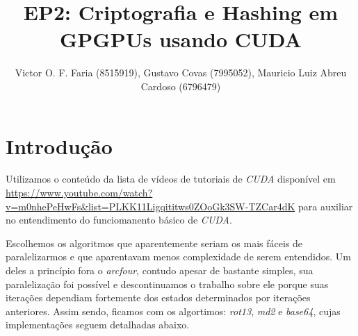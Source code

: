 \documentclass[final,12pt,a4paper]{elsarticle}
\begin{document}
\begin{frontmatter}


\title{EP2: Criptografia e Hashing em GPGPUs usando CUDA}




\author{Victor O. F. Faria (8515919), Gustavo Covas (7995052), Mauricio Luiz Abreu Cardoso (6796479)}

\address{MAC 5742-0219 Introdução à Programação Concorrente, Paralela e Distribuída}

\end{frontmatter}


\section{Introdução}

Utilizamos o conteúdo da lista de vídeos de tutoriais de \textit{CUDA} disponível em \url{https://www.youtube.com/watch?v=m0nhePeHwFs&list=PLKK11Ligqititws0ZOoGk3SW-TZCar4dK} para auxiliar no entendimento do funciomanento básico de \textit{CUDA}.

Escolhemos os algoritmos que aparentemente seriam os mais fáceis de paralelizarmos e que aparentavam menos complexidade de serem entendidos. Um deles a princípio fora o \textit{arcfour}, contudo apesar de bastante simples, sua paralelização foi possível e descontinuamos o trabalho sobre ele porque suas iterações dependiam fortemente dos estados determinados por iterações anteriores. Assim sendo, ficamos com os algortimos: \textit{rot13}, \textit{md2} e \textit{base64}, cujas implementações seguem detalhadas abaixo.
\end{document}
